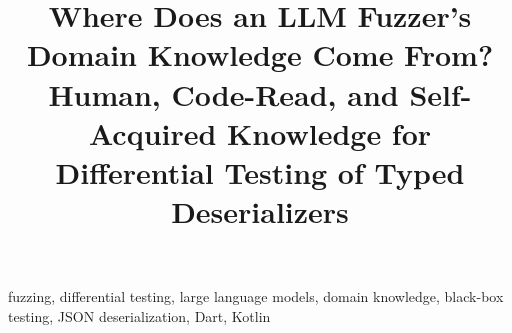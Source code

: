 \documentclass[10pt,conference,letterpaper]{IEEEtran}
\title{Where Does an LLM Fuzzer's Domain Knowledge Come From?\\
Human, Code-Read, and Self-Acquired Knowledge for Differential Testing of Typed Deserializers}
\author{
\IEEEauthorblockN{Anonymous Author(s)}
\IEEEauthorblockA{Submission under double-blind review}
}
\begin{document}
\maketitle

\begin{abstract}

\end{abstract}

\begin{IEEEkeywords}
fuzzing, differential testing, large language models, domain knowledge, black-box testing, JSON deserialization, Dart, Kotlin
\end{IEEEkeywords}












\end{document}
